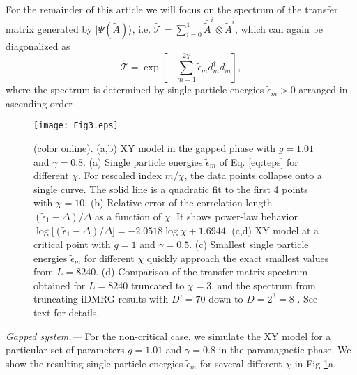 \documentclass[prl,twocolumn,showpacs,floatfix,superscriptaddress,nofootinbib]{revtex4-1}
\begin{document}
For the remainder of this article we will focus on the spectrum of the transfer matrix generated by 
$|\Psi (\tilde A)\rangle$, i.e. $\tilde{ \mathcal{T}} = \sum_{i=0}^1 \bar{\tilde{A}}^{i} \otimes \tilde A^i$, which can again be diagonalized as
\begin{equation} \label{eq:teps}
\tilde{ \mathcal{T}} = \exp\left[- \sum_{m=1}^{2\chi} \tilde \epsilon_m d^\dagger_m d_m \right],
\end{equation}
where the spectrum  is determined by single particle energies $\tilde \epsilon_m >0 $ arranged in ascending order \cite{truncation}. 


\begin{figure}[t] 
\begin{center}
\texttt{[image: Fig3.eps]}
\end{center}
\caption{(color online). (a,b) XY model in the gapped phase with $g=1.01$ and $\gamma = 0.8$. 
(a) Single particle energies $\tilde \epsilon_m$ of Eq. \eqref{eq:teps} for different $\chi$.  For rescaled index $m/\chi$, the data points collapse onto a single curve. The solid line is a quadratic fit to the first 4 points with $\chi=10$.
(b) Relative error of the correlation length $(\tilde \epsilon_1-\Delta)/\Delta$ as a function of $\chi$. It shows power-law behavior $\log \big[(\tilde \epsilon_1 - \Delta)/\Delta\big] = -2.0518 \log \chi +1.6944$.  
(c,d) XY model at a critical point with $g=1$ and $\gamma = 0.5$.
(c) Smallest single particle energies $\tilde \epsilon_m$ for different $\chi$ quickly approach the exact smallest values from $L = 8240$.
(d) Comparison of the transfer matrix spectrum obtained for $L=8240$ truncated to $\chi=3$, and the spectrum from truncating iDMRG results with $D'=70$ down to $D=2^{3}=8$ \cite{iDMRG*}. See text for details.
}
\label{fig:num}
\end{figure}



{\it Gapped system.--- }
For the non-critical case, we simulate the XY model for a particular set of parameters $g=1.01$ and $\gamma=0.8$ in the paramagnetic phase.   
We show the resulting single particle energies $\tilde \epsilon_m$ for several different $\chi$ in Fig \ref{fig:num}a.
\end{document}
